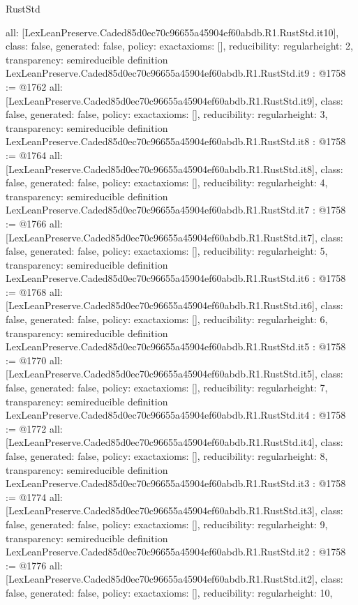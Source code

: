 \begin{lexlean}{RustStd}
\begin{coremodule}
{  all: [LexLeanPreserve.Caded85d0ec70c96655a45904ef60abdb.R1.RustStd.it10],
  class: false,
  generated: false,
  policy: exact{axioms: []},
  reducibility: regular{height: 2},
  transparency: semireducible
}
definition LexLeanPreserve.Caded85d0ec70c96655a45904ef60abdb.R1.RustStd.it9 : @1758 := @1762 {
  all: [LexLeanPreserve.Caded85d0ec70c96655a45904ef60abdb.R1.RustStd.it9],
  class: false,
  generated: false,
  policy: exact{axioms: []},
  reducibility: regular{height: 3},
  transparency: semireducible
}
definition LexLeanPreserve.Caded85d0ec70c96655a45904ef60abdb.R1.RustStd.it8 : @1758 := @1764 {
  all: [LexLeanPreserve.Caded85d0ec70c96655a45904ef60abdb.R1.RustStd.it8],
  class: false,
  generated: false,
  policy: exact{axioms: []},
  reducibility: regular{height: 4},
  transparency: semireducible
}
definition LexLeanPreserve.Caded85d0ec70c96655a45904ef60abdb.R1.RustStd.it7 : @1758 := @1766 {
  all: [LexLeanPreserve.Caded85d0ec70c96655a45904ef60abdb.R1.RustStd.it7],
  class: false,
  generated: false,
  policy: exact{axioms: []},
  reducibility: regular{height: 5},
  transparency: semireducible
}
definition LexLeanPreserve.Caded85d0ec70c96655a45904ef60abdb.R1.RustStd.it6 : @1758 := @1768 {
  all: [LexLeanPreserve.Caded85d0ec70c96655a45904ef60abdb.R1.RustStd.it6],
  class: false,
  generated: false,
  policy: exact{axioms: []},
  reducibility: regular{height: 6},
  transparency: semireducible
}
definition LexLeanPreserve.Caded85d0ec70c96655a45904ef60abdb.R1.RustStd.it5 : @1758 := @1770 {
  all: [LexLeanPreserve.Caded85d0ec70c96655a45904ef60abdb.R1.RustStd.it5],
  class: false,
  generated: false,
  policy: exact{axioms: []},
  reducibility: regular{height: 7},
  transparency: semireducible
}
definition LexLeanPreserve.Caded85d0ec70c96655a45904ef60abdb.R1.RustStd.it4 : @1758 := @1772 {
  all: [LexLeanPreserve.Caded85d0ec70c96655a45904ef60abdb.R1.RustStd.it4],
  class: false,
  generated: false,
  policy: exact{axioms: []},
  reducibility: regular{height: 8},
  transparency: semireducible
}
definition LexLeanPreserve.Caded85d0ec70c96655a45904ef60abdb.R1.RustStd.it3 : @1758 := @1774 {
  all: [LexLeanPreserve.Caded85d0ec70c96655a45904ef60abdb.R1.RustStd.it3],
  class: false,
  generated: false,
  policy: exact{axioms: []},
  reducibility: regular{height: 9},
  transparency: semireducible
}
definition LexLeanPreserve.Caded85d0ec70c96655a45904ef60abdb.R1.RustStd.it2 : @1758 := @1776 {
  all: [LexLeanPreserve.Caded85d0ec70c96655a45904ef60abdb.R1.RustStd.it2],
  class: false,
  generated: false,
  policy: exact{axioms: []},
  reducibility: regular{height: 10},
}
\end{coremodule}
\end{lexlean}
